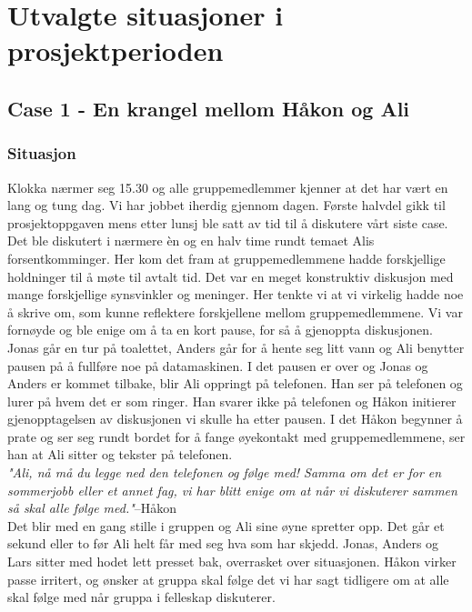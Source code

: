 \chapter{Utvalgte situasjoner i prosjektperioden}

\section{Case 1 - En krangel mellom Håkon og Ali}

\subsection{Situasjon}


Klokka nærmer seg 15.30 og alle gruppemedlemmer kjenner at det har vært en lang og tung dag. Vi har jobbet iherdig gjennom dagen. Første halvdel gikk til prosjektoppgaven mens etter lunsj ble satt av tid til å diskutere vårt siste case. Det ble diskutert i nærmere èn og en halv time rundt temaet Alis forsentkomminger. Her kom det fram at gruppemedlemmene hadde forskjellige holdninger til å møte til avtalt tid. Det var en meget konstruktiv diskusjon med mange forskjellige synsvinkler og meninger. Her tenkte vi at vi virkelig hadde noe å skrive om, som kunne reflektere forskjellene mellom gruppemedlemmene. Vi var fornøyde og ble enige om å ta en kort pause, for så å gjenoppta diskusjonen. Jonas går en tur på toalettet, Anders går for å hente seg litt vann og Ali benytter pausen på å fullføre noe på datamaskinen. I det pausen er over og Jonas og Anders er kommet tilbake, blir Ali oppringt på telefonen. Han ser på telefonen og lurer på hvem det er som ringer. Han svarer ikke på telefonen og Håkon initierer gjenopptagelsen av diskusjonen vi skulle ha etter pausen. I det Håkon begynner å prate og ser seg rundt bordet for å fange øyekontakt med gruppemedlemmene, ser han at Ali sitter og tekster på telefonen.\\

\textit{"Ali, nå må du legge ned den telefonen og følge med! Samma om det er for en sommerjobb eller et annet fag, vi har blitt enige om at når vi diskuterer sammen så skal alle følge med."}{--Håkon}\\

Det blir med en gang stille i gruppen og Ali sine øyne spretter opp. Det går et sekund eller to før Ali helt får med seg hva som har skjedd. Jonas, Anders og Lars sitter med hodet lett presset bak, overrasket over situasjonen. Håkon virker passe irritert, og ønsker at gruppa skal følge det vi har sagt tidligere om at alle skal følge med når gruppa i felleskap diskuterer.\\

